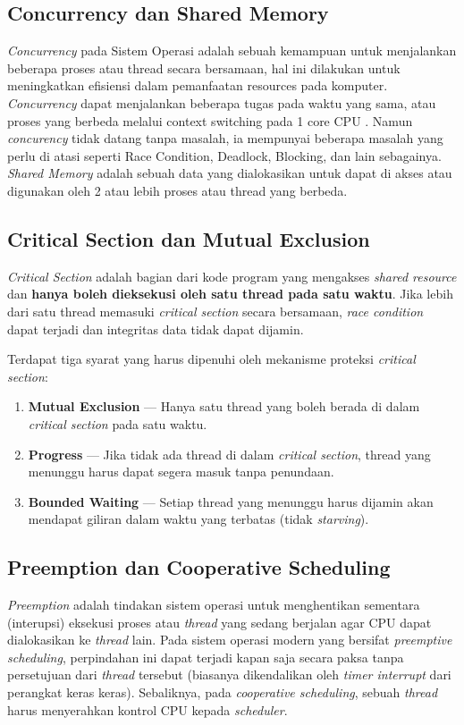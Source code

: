 \subsection{Concurrency dan Shared Memory}
\textit{Concurrency} pada Sistem Operasi adalah sebuah kemampuan untuk menjalankan beberapa proses atau thread secara bersamaan,
hal ini dilakukan untuk meningkatkan efisiensi dalam pemanfaatan resources pada komputer. \textit{Concurrency} dapat menjalankan beberapa tugas pada waktu yang sama,
atau proses yang berbeda melalui context switching pada 1 core CPU \cite{noauthor_concurrency_nodate}. Namun \textit{concurency} tidak datang tanpa masalah, ia mempunyai beberapa masalah yang perlu di atasi 
seperti Race Condition, Deadlock, Blocking, dan lain sebagainya. \\

\textit{Shared Memory} adalah sebuah data yang dialokasikan untuk dapat di akses atau digunakan oleh 2 atau lebih proses atau thread yang berbeda.

\subsection{Critical Section dan Mutual Exclusion}
\textit{Critical Section} adalah bagian dari kode program yang mengakses \textit{shared resource} dan \textbf{hanya boleh dieksekusi oleh satu thread pada satu waktu}.
Jika lebih dari satu thread memasuki \textit{critical section} secara bersamaan, \textit{race condition} dapat terjadi dan integritas data tidak dapat dijamin.
 
Terdapat tiga syarat yang harus dipenuhi oleh mekanisme proteksi \textit{critical section}:
\begin{enumerate}
    \item \textbf{Mutual Exclusion} --- Hanya satu thread yang boleh berada di dalam \textit{critical section} pada satu waktu.
    \item \textbf{Progress} --- Jika tidak ada thread di dalam \textit{critical section}, thread yang menunggu harus dapat segera masuk tanpa penundaan.
    \item \textbf{Bounded Waiting} --- Setiap thread yang menunggu harus dijamin akan mendapat giliran dalam waktu yang terbatas (tidak \textit{starving}).
\end{enumerate}

\subsection{Preemption dan Cooperative Scheduling}
\textit{Preemption} adalah tindakan sistem operasi untuk menghentikan sementara (interupsi) eksekusi proses atau \textit{thread} yang sedang berjalan agar CPU dapat dialokasikan ke \textit{thread} lain.
Pada sistem operasi modern yang bersifat \textit{preemptive scheduling}, perpindahan ini dapat terjadi kapan saja secara paksa tanpa persetujuan dari \textit{thread} tersebut (biasanya dikendalikan oleh
\textit{timer interrupt} dari perangkat keras keras).
Sebaliknya, pada \textit{cooperative scheduling}, sebuah \textit{thread} harus menyerahkan kontrol CPU kepada \textit{scheduler}. 

